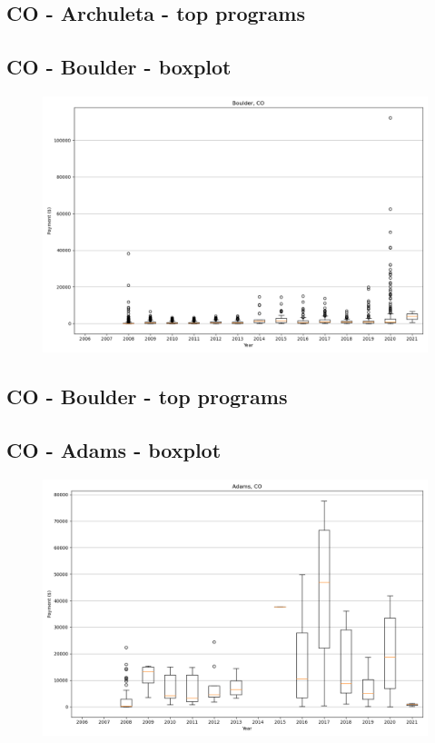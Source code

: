 \subsection*{CO - Archuleta - top programs}

\newpage
\subsection*{CO - Boulder - boxplot}
\begin{figure}[h]
\centering
\includegraphics[width=7in]{../output/boxplots/counties/Boulder-CO_boxplot.png}
\end{figure}


\subsection*{CO - Boulder - top programs}

\newpage
\subsection*{CO - Adams - boxplot}
\begin{figure}[h]
\centering
\includegraphics[width=7in]{../output/boxplots/counties/Adams-CO_boxplot.png}
\end{figure}


